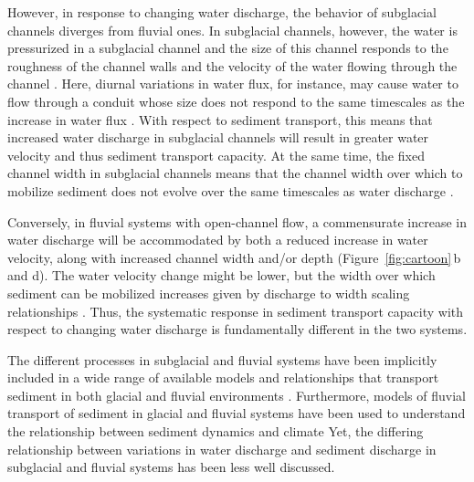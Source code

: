 \documentclass[11pt]{article}
\begin{document}
\begin{spacing}{1}
  However, in response to changing water discharge, the behavior of subglacial channels diverges from fluvial ones.
  In subglacial channels, however, the water is pressurized in a subglacial channel and the size of this channel responds to the roughness of the channel walls and the velocity of the water flowing through the channel \citep[Figure~\ref{fig:cartoon}\,a and c; e.g. ][]{rothlisberger1972}.
  Here, diurnal variations in water flux, for instance, may cause water to flow through a conduit whose size does not respond to the same timescales as the increase in water flux \citep{rothlisberger1972}.
  With respect to sediment transport, this means that increased water discharge in subglacial channels will result in greater water velocity and thus sediment transport capacity.
  At the same time, the fixed channel width in subglacial channels means that the channel width over which to mobilize sediment does not evolve over the same timescales as water discharge \citep[e.g.][]{werder2010}.
  
  Conversely, in fluvial systems with open-channel flow, a commensurate increase in water discharge will be accommodated by both a reduced increase in water velocity, along with increased channel width and/or depth (Figure~\ref{fig:cartoon}\,b and d).
  The water velocity change might be lower, but the width over which sediment can be mobilized increases given by discharge to width scaling relationships \citep{yalin1992}.
  Thus, the systematic response in sediment transport capacity with respect to changing water discharge is fundamentally different in the two systems.

  The different processes in subglacial and fluvial systems have been implicitly included in a wide range of available models and relationships that transport sediment in both glacial and fluvial environments \citep[e.g.][]{yalin1992,walder1994,beaud2018,wickert2019}.
  Furthermore, models of fluvial transport of sediment in glacial and fluvial systems have been used to understand the relationship between sediment dynamics and climate \citep[e.g.][]{tucker1997,delaney2020}
  Yet, the differing relationship between variations in water discharge and sediment discharge in subglacial and fluvial systems  has been less well discussed.


\end{spacing}
\end{document}
